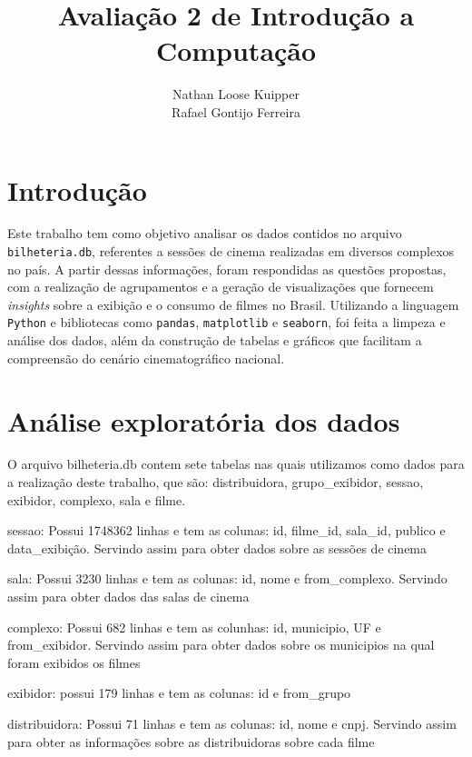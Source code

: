 \documentclass{article}
\title{Avaliação 2 de Introdução a Computação}
\author{Nathan Loose Kuipper \\ Rafael Gontijo Ferreira}
\begin{document}
\maketitle

\begin{abstract}

\lipsum[1-2]  %
\end{abstract}
\pagebreak
\section{Introdução}
Este trabalho tem como objetivo analisar os dados contidos no arquivo \texttt{bilheteria.db}, referentes a sessões de cinema realizadas em diversos complexos no país. A partir dessas informações, foram respondidas as questões propostas, com a realização de agrupamentos e a geração de visualizações que fornecem \textit{insights} sobre a exibição e o consumo de filmes no Brasil. Utilizando a linguagem \texttt{Python} e bibliotecas como \texttt{pandas}, \texttt{matplotlib} e \texttt{seaborn}, foi feita a limpeza e análise dos dados, além da construção de tabelas e gráficos que facilitam a compreensão do cenário cinematográfico nacional.

\section{Análise exploratória dos dados}

O arquivo bilheteria.db contem sete tabelas nas quais utilizamos como dados para a realização deste trabalho,
que são: distribuidora, grupo_exibidor, sessao, exibidor, complexo, sala e filme.

sessao: Possui 1748362 linhas e tem as colunas: id, filme_id, sala_id, publico e data_exibição. Servindo assim para obter dados sobre as sessões de cinema

sala: Possui 3230 linhas e tem as colunas: id, nome e from_complexo. Servindo assim para obter dados das salas de cinema

complexo: Possui 682 linhas e tem as colunhas: id, municipio, UF e from_exibidor. Servindo assim para obter dados sobre os municipios na qual foram exibidos os filmes

exibidor: possui 179 linhas e tem as colunas: id e from_grupo

distribuidora: Possui 71 linhas e tem as colunas: id, nome e cnpj. Servindo assim para obter as informações sobre as distribuidoras sobre cada filme
\end{document}

